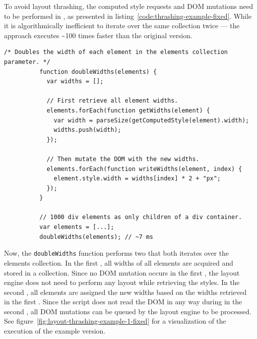 \documentclass[a4paper,11pt]{kth-mag}
\newcommand{\code}[1]{\texttt{#1}}
\begin{document}
        To avoid \gls{layout thrashing}, the computed style requests and \gls{DOM} mutations need to be performed in , as presented in listing~\ref{code:thrashing-example-fixed}.
        While it is algorithmically inefficient to iterate over the same collection twice --- the  approach executes \textasciitilde100 times faster than the original version.
        \begin{lstlisting}[gobble=10,caption={Example of avoiding \gls{layout thrashing} by \gls{batch processing} reads and writes to the \gls{DOM}. The code reads and double the widths of 1000 \glspl{element} in \textasciitilde7 ms.}, captionpos=b, label={code:thrashing-example-fixed}]
          /* Doubles the width of each element in the elements collection parameter. */
          function doubleWidths(elements) {
            var widths = [];

            // First retrieve all element widths.
            elements.forEach(function getWidths(element) {
              var width = parseSize(getComputedStyle(element).width);
              widths.push(width);
            });

            // Then mutate the DOM with the new widths.
            elements.forEach(function writeWidths(element, index) {
              element.style.width = widths[index] * 2 + "px";
            });
          }

          // 1000 div elements as only children of a div container.
          var elements = [...];
          doubleWidths(elements); // ~7 ms
        \end{lstlisting}
        Now, the \code{doubleWidths} function performs two  that both iterates over the \glspl{element} collection.
        In the first , all widths of all \glspl{element} are acquired and stored in a collection.
        Since no \gls{DOM} mutation occurs in the first , the \gls{layout engine} does not need to perform any layout while retrieving the styles.
        In the second , all \glspl{element} are assigned the new widths based on the widths retrieved in the first .
        Since the script does not read the \gls{DOM} in any way during in the second , all \gls{DOM} mutations can be queued by the \gls{layout engine} to be  processed.
        See figure~\ref{fig:layout-thrashing-example-1-fixed} for a visualization of the execution of the  example version.
\end{document}
